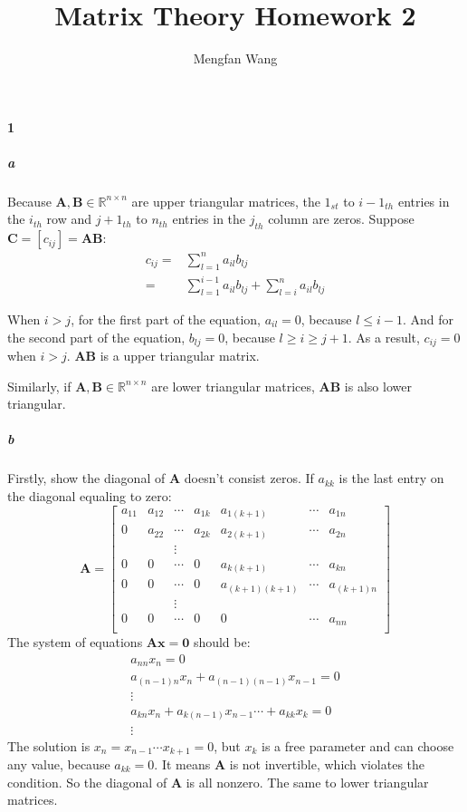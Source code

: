 \documentclass[22pt]{article}
\author{Mengfan Wang}
\title{Matrix Theory Homework 2}
\begin{document}
	\maketitle 
	\paragraph{1}
		\subparagraph{a} Because $\mathbf{A},\mathbf{B} \in \mathbb{R}^{n\times n}$ are upper triangular matrices, the $1_{st}$ to $i-1_{th}$ entries in the $i_{th}$ row and $j+1_{th}$ to $n_{th}$ entries in the $j_{th}$ column are zeros. Suppose $\mathbf{C} =[c_{ij}]= \mathbf{AB}$:
		\begin{align}
			c_{ij} =& \sum\limits_{l=1}^{n}a_{il}b_{lj}\\ =& \sum\limits_{l=1}^{i-1}a_{il}b_{lj} + \sum\limits_{l=i}^{n}a_{il}b_{lj}
		\end{align}

		When $i>j$, for the first part of the equation, $a_{il} = 0$, because $l \leq i-1$. And for the second part of the equation, $b_{lj}=0$, because $l \geq i \geq j+1$. As a result, $c_{ij} =0$ when $i>j$. $\mathbf{AB}$ is a upper triangular matrix.

		Similarly, if $\mathbf{A},\mathbf{B} \in \mathbb{R}^{n\times n}$ are lower triangular matrices, $\mathbf{AB}$ is also lower triangular.

		\subparagraph{b} Firstly, show the diagonal of $\mathbf{A}$ doesn't consist zeros. If $a_{kk}$ is the last entry on the diagonal equaling to zero:
		\begin{equation}
			\mathbf{A} = \left[ \begin{array}{ccccccc} a_{11} & a_{12} & \cdots &a_{1k}&a_{1(k+1)} &\cdots &a_{1n}\\
			0&a_{22}&\cdots&a_{2k}&a_{2(k+1)}&\cdots &a_{2n}\\
			&&\vdots\\
			0&0&\cdots&0&a_{k(k+1)}&\cdots &a_{kn}\\
			0&0&\cdots&0&a_{(k+1)(k+1)}&\cdots &a_{(k+1)n}\\
			&&\vdots\\
			0&0&\cdots&0&0&\cdots &a_{nn}\\
		\end{array}\right]
		\end{equation}
		The system of equations $\mathbf{Ax}=\mathbf{0}$ should be:
		\begin{align}
			a_{nn}x_n = 0\\
			a_{(n-1)n}x_n+a_{(n-1)(n-1)}x_{n-1}= 0\\
			\vdots\\
			a_{kn}x_n+a_{k(n-1)}x_{n-1} \cdots + a_{kk}x_k = 0\\
			\vdots
		\end{align}
		The solution is $x_n=x_{n-1} \cdots x_{k+1} = 0$, but $x_k$ is a free parameter and can choose any value, because $a_{kk}=0$. It means $\mathbf{A}$ is not invertible, which violates the condition. So the diagonal of $\mathbf{A}$ is all nonzero. The same to lower triangular matrices. 
\end{document}
